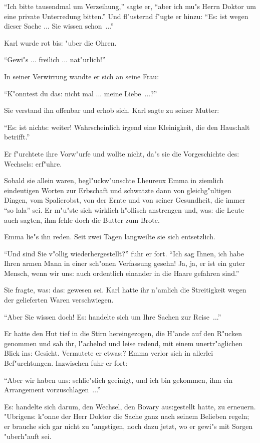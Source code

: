 \documentclass[oneside,12pt]{book}
\newcommand{\s}{s:}%
\begin{document}
"`Ich bitte tausendmal um Verzeihung,"' sagte er, "`aber ich mu"s
Herrn Doktor um eine private Unterredung bitten."' Und fl"usternd
f"ugte er hinzu: "`E{\s} ist wegen dieser Sache ... Sie wissen
schon~..."'

Karl wurde rot bi{\s} "uber die Ohren.

"`Gewi"s ... freilich ... nat"urlich!"'

In seiner Verwirrung wandte er sich an seine Frau:

"`K"onntest du da{\s} nicht mal ... meine Liebe~...?"'

Sie verstand ihn offenbar und erhob sich. Karl sagte zu seiner
Mutter:

"`E{\s} ist nicht{\s} weiter! Wahrscheinlich irgend eine
Kleinigkeit, die den Hau{\s}halt betrifft."'

Er f"urchtete ihre Vorw"urfe und wollte nicht, da"s sie die
Vorgeschichte de{\s} Wechsel{\s} erf"uhre.

Sobald sie allein waren, begl"uckw"unschte Lheureux Emma in
ziemlich eindeutigen Worten zur Erbschaft und schwatzte dann von
gleichg"ultigen Dingen, vom Spalierobst, von der Ernte und von
seiner Gesundheit, die immer "`so lala"' sei. Er m"u"ste sich
wirklich h"ollisch anstrengen und, wa{\s} die Leute auch sagten,
ihm fehle doch die Butter zum Brote.

Emma lie"s ihn reden. Seit zwei Tagen langweilte sie sich
entsetzlich.

"`Und sind Sie v"ollig wiederhergestellt?"' fuhr er fort. "`Ich
sag Ihnen, ich habe Ihren armen Mann in einer sch"onen Verfassung
gesehn! Ja, ja, er ist ein guter Mensch, wenn wir un{\s} auch
ordentlich einander in die Haare gefahren sind."'

Sie fragte, wa{\s} da{\s} gewesen sei. Karl hatte ihr n"amlich die
Streitigkeit wegen der gelieferten Waren verschwiegen.

"`Aber Sie wissen doch! E{\s} handelte sich um Ihre Sachen zur
Reise~..."'

Er hatte den Hut tief in die Stirn hereingezogen, die H"ande auf
den R"ucken genommen und sah ihr, l"achelnd und leise redend, mit
einem unertr"aglichen Blick in{\s} Gesicht. Vermutete er etwa{\s}?
Emma verlor sich in allerlei Bef"urchtungen. Inzwischen fuhr er
fort:

"`Aber wir haben un{\s} schlie"slich geeinigt, und ich bin
gekommen, ihm ein Arrangement vorzuschlagen~..."'

E{\s} handelte sich darum, den Wechsel, den Bovary au{\s}gestellt
hatte, zu erneuern. "Ubrigen{\s} k"onne der Herr Doktor die Sache
ganz nach seinem Belieben regeln; er brauche sich gar nicht zu
"angstigen, noch dazu jetzt, wo er gewi"s mit Sorgen "uberh"auft
sei.
\end{document}
